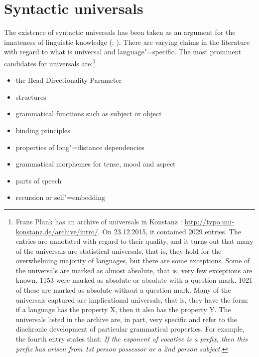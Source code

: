 \section{Syntactic universals}
\label{sec-syntactic-universals}

The existence of syntactic universals has been taken as an argument for the innateness of linguistic knowledge
(\eg \citealp[]{Chomsky98a-u}; %
\citealp[--238]{Pinker94a}). There are varying claims in the literature with regard to what is universal and 
language"=specific. The most prominent candidates for universals are:\footnote{
Frans Plank has an archive of universals in Konstanz \citep{PF2000a}:
\url{http://typo.uni-konstanz.de/archive/intro/}. On 23.12.2015, it contained 2029 entries.
The entries are annotated with regard to their quality, and it turns out that many of the universals
are statistical universals, that is, they hold for the overwhelming majority of languages, but there are
some exceptions. Some of the universals are marked as almost absolute, that is, very few exceptions are known.
1153 were marked as absolute or absolute with a question mark. 1021 of these are marked as absolute without
a question mark. Many of the universals captured are implicational universals, that is, they have the form:
if a language has the property X, then it also has the property Y. The universals listed in the archive
are, in part, very specific and refer to the diachronic development of particular grammatical
properties. For example, the fourth entry states that: \emph{If the exponent of
  vocative is a prefix, then this prefix has arisen from 1st person possessor or a 2nd person
  subject.} 
}\nocite{Harbour2011a}

\begin{itemize}
\item the Head Directionality Parameter
\item \xbar structures
\item grammatical functions such as subject or object
\item binding principles
\item properties of long"=distance dependencies
\item grammatical morphemes for tense, mood and aspect
\item parts of speech
\item recursion or self"=embedding
\end{itemize}

